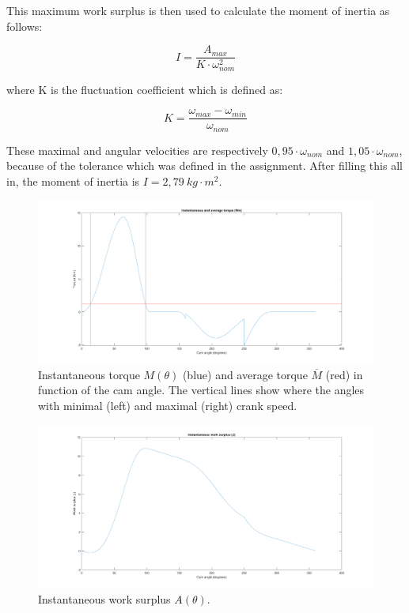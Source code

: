 \documentclass[a4paper]{article}
\begin{document}
This maximum work surplus is then used to calculate the moment of inertia as follows:

\begin{equation}
	I = \frac{A_{max}}{K\cdot\omega_{nom}^2}
\end{equation}

where K is the fluctuation coefficient which is defined as:

\begin{equation}
	K = \frac{\omega_{max}-\omega_{min}}{\omega_{nom}}
\end{equation}

These maximal and angular velocities are respectively \(0,95\cdot\omega_{nom}\) and \(1,05\cdot\omega_{nom}\), because of the tolerance which was defined in the assignment. After filling this all in, the moment of inertia is \(I=2,79~kg\cdot m^2\).

\begin{figure}
	\centering
	\includegraphics[width=.9\textwidth]{torque.png}
	\caption{Instantaneous torque \(M(\theta)\) (blue) and average torque \(\overline{M}\) (red) in function of the cam angle. The vertical lines show where the angles with minimal (left) and maximal (right) crank speed.}
	\label{fig:torque}
\end{figure}
\begin{figure}
	\centering
	\includegraphics[width=.9\textwidth]{work.png}
	\caption{Instantaneous work surplus \(A(\theta)\).}
	\label{fig:work}
\end{figure}
\end{document}
